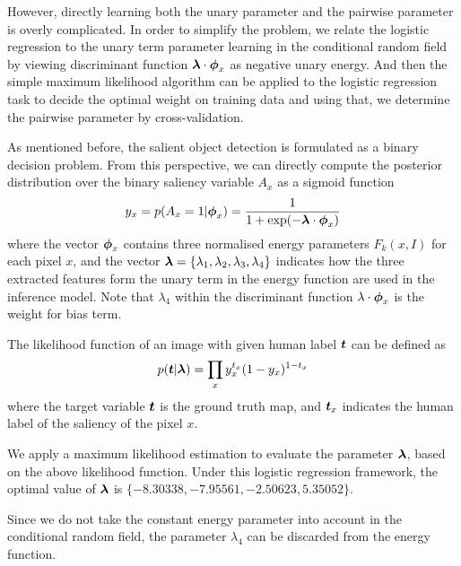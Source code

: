 \documentclass[10pt,twocolumn,letterpaper]{article}
\begin{document}
However, directly learning both the unary parameter and the pairwise parameter is overly complicated. In order to simplify the problem, we relate the logistic regression to the unary term parameter learning in the conditional random field by viewing discriminant function $\boldsymbol{\lambda} \cdot \boldsymbol{\phi}_x$ as negative unary energy. And then the simple maximum likelihood algorithm can be applied to the logistic regression task to decide the optimal weight on training data and using that, we determine the pairwise parameter by cross-validation.


As mentioned before, the salient object detection is formulated as a binary decision problem. From this perspective, we can directly compute the posterior distribution over the binary saliency variable $A_x$ as a sigmoid function
$$ y_x = p ( A_x = 1 | \boldsymbol{\phi}_x) = \frac{1}{1 + \exp(-\boldsymbol{\lambda} \cdot \boldsymbol{\phi}_x)}$$
where the vector $\boldsymbol{\phi}_x$ contains three normalised energy parameters $F_k (x, I)$ for each pixel $x$, and the vector $\boldsymbol{\lambda} = \{ \lambda_1, \lambda_2, \lambda_3, \lambda_4\}$ indicates how the three extracted features form the unary term in the energy function are used in the inference model. Note that $\lambda_4$ within the discriminant function $\lambda \cdot \boldsymbol{\phi}_x$ is the weight for bias term.

The likelihood function of an image with given human label $\boldsymbol{t}$ can be defined as
$$ p( \boldsymbol{t} | \boldsymbol{\lambda}) = \prod_{x} y_{x}^{t_{x}} (1 - y_{x})^{1-t_x} $$
where the target variable $\boldsymbol{t}$ is the ground truth map, and $\boldsymbol{t}_x$ indicates the human label of the saliency of the pixel $x$. 

We apply a maximum likelihood estimation to evaluate the parameter $\boldsymbol{\lambda}$, based on the above likelihood function.  Under this logistic regression framework, the optimal value of $\boldsymbol{\lambda}$ is $\{-8.30338 ,-7.95561, -2.50623, 5.35052\}$. 

Since we do not take the constant energy parameter into account in the conditional random field, the parameter $\lambda_4$ can be discarded from the energy function.

\end{document}
